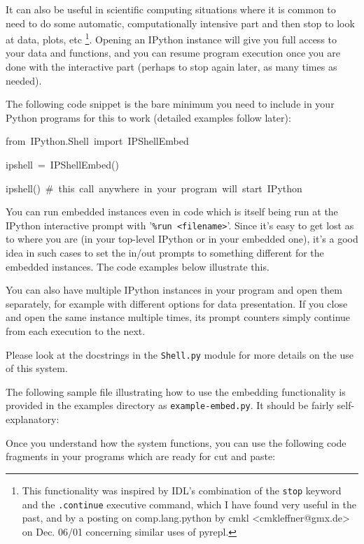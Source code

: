 It can also be useful in scientific computing situations where it
is common to need to do some automatic, computationally intensive
part and then stop to look at data, plots, etc%
\footnote{This functionality was inspired by IDL's combination of the \texttt{stop}
keyword and the \texttt{.continue} executive command, which I have
found very useful in the past, and by a posting on comp.lang.python
by cmkl <cmkleffner@gmx.de> on Dec. 06/01 concerning similar uses
of pyrepl.%
}. Opening an IPython instance will give you full access to your data
and functions, and you can resume program execution once you are done
with the interactive part (perhaps to stop again later, as many times
as needed).

The following code snippet is the bare minimum you need to include
in your Python programs for this to work (detailed examples follow
later):

\begin{lyxcode}
from~IPython.Shell~import~IPShellEmbed

ipshell~=~IPShellEmbed()

ipshell()~\#~this~call~anywhere~in~your~program~will~start~IPython
\end{lyxcode}
You can run embedded instances even in code which is itself being
run at the IPython interactive prompt with '\texttt{\%run~<filename>}'.
Since it's easy to get lost as to where you are (in your top-level
IPython or in your embedded one), it's a good idea in such cases to
set the in/out prompts to something different for the embedded instances.
The code examples below illustrate this.

You can also have multiple IPython instances in your program and open
them separately, for example with different options for data presentation.
If you close and open the same instance multiple times, its prompt
counters simply continue from each execution to the next.

Please look at the docstrings in the \texttt{Shell.py} module for
more details on the use of this system.

The following sample file illustrating how to use the embedding functionality
is provided in the examples directory as \texttt{example-embed.py}.
It should be fairly self-explanatory:



Once you understand how the system functions, you can use the following
code fragments in your programs which are ready for cut and paste:

